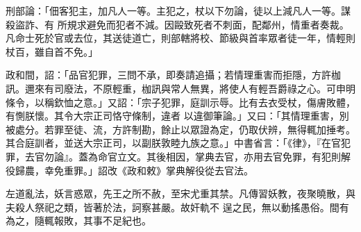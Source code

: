 \begin{pinyinscope}
 刑部論：「佃客犯主，加凡人一等。主犯之，杖以下勿論，徒以上減凡人一等。謀殺盜詐、有
 所規求避免而犯者不減。因毆致死者不刺面，配鄰州，情重者奏裁。凡命士死於官或去位，其送徒道亡，則部轄將校、節級與首率眾者徒一年，情輕則杖百，雖自首不免。」



 政和間，詔：「品官犯罪，三問不承，即奏請追攝；若情理重害而拒隱，方許枷訊。邇來有司廢法，不原輕重，枷訊與常人無異，將使人有輕吾爵祿之心。可申明條令，以稱欽恤之意。」又詔：「宗子犯罪，庭訓示辱。比有去衣受杖，傷膚敗體，有惻朕懷。其令大宗正司恪守條制，違者
 以違御筆論。」又曰：「其情理重害，別被處分。若罪至徒、流，方許制勘，餘止以眾證為定，仍取伏辨，無得輒加捶考。其合庭訓者，並送大宗正司，以副朕敦睦九族之意。」中書省言：「《律》，『在官犯罪，去官勿論』。蓋為命官立文。其後相因，掌典去官，亦用去官免罪，有犯則解役歸農，幸免重罪。」詔改《政和敕》掌典解役從去官法。



 左道亂法，妖言惑眾，先王之所不赦，至宋尤重其禁。凡傳習妖教，夜聚曉散，與夫殺人祭祀之類，皆著於法，訶察甚嚴。故奸軌不
 逞之民，無以動搖愚俗。間有為之，隨輒報敗，其事不足紀也。



\end{pinyinscope}